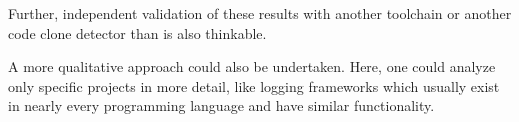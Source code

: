 Further, independent validation of these results with another toolchain or another code clone detector than \teamscale{} is also thinkable.

A more qualitative approach could also be undertaken. Here, one could analyze only specific projects in more detail, like logging frameworks which usually exist in nearly every programming language and have similar functionality.
 

